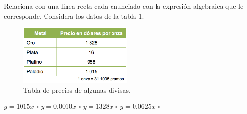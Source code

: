 Relaciona con una linea recta cada enunciado con la expresión algebraica que le corresponde. Considera los datos de la tabla \ref{fig:SINMAT1_U3_AC72_IMG1}.
\begin{figure}[H]
    \centering
    \includegraphics[width=0.5\textwidth]{../images/SINMAT1_U3_AC72_IMG1}
    \caption{Tabla de precios de algunas divisas.}
    \label{fig:SINMAT1_U3_AC72_IMG1}
\end{figure}
\begin{multicols}{2}
    \begin{choices}
        \choice $y = 1 015x$ $\square$
        \choice $y = 0.0010x$ $\square$
        \choice $y = 1 328x$ $\square$
        \choice $y = 0.0625x$ $\square$
    \end{choices}
    \columnbreak
\end{multicols}